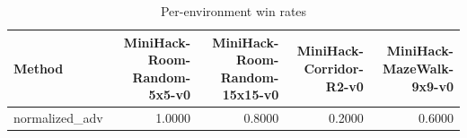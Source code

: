 \begin{table}[htbp]
\centering
\caption{Per-environment win rates}
\label{tab:per-env}
\begin{tabular}{lrrrr}
\toprule
\textbf{Method} & \textbf{MiniHack-Room-Random-5x5-v0} & \textbf{MiniHack-Room-Random-15x15-v0} & \textbf{MiniHack-Corridor-R2-v0} & \textbf{MiniHack-MazeWalk-9x9-v0} \\
\midrule
normalized\_adv & 1.0000 & 0.8000 & 0.2000 & 0.6000 \\
\bottomrule
\end{tabular}
\end{table}
